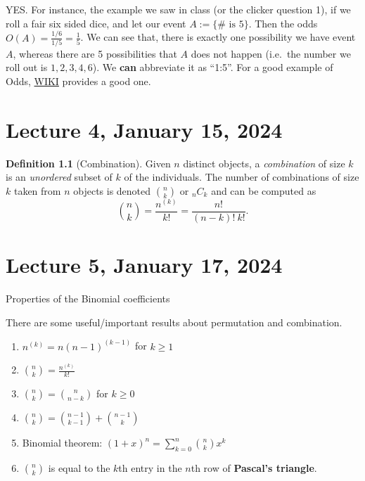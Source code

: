 \documentclass[
]{book}
\providecommand{\tightlist}{%
  \setlength{\itemsep}{0pt}\setlength{\parskip}{0pt}}
\theoremstyle{definition}
\newtheorem{definition}{Definition}[chapter]
\theoremstyle{definition}
\theoremstyle{definition}
\theoremstyle{definition}
\theoremstyle{remark}
\begin{document}
YES. For instance, the example we saw in class (or the clicker question 1), if we roll a fair six sided dice, and let our event \(A:=\{\text{# is } 5 \}\). Then the odds \(O(A)=\frac{1/6}{1/5}=\frac{1}{5}\). We can see that, there is exactly one possibility we have event \(A\), whereas there are 5 possibilities that \(A\) does not happen (i.e.~the number we roll out is \(1,2,3,4,6\)). We \textbf{can} abbreviate it as ``1:5''. For a good example of Odds, \href{https://en.wikipedia.org/wiki/Odds}{WIKI} provides a good one.

\hypertarget{lecture-4-january-15-2024}{%
\chapter{Lecture 4, January 15, 2024}\label{lecture-4-january-15-2024}}

\begin{definition}[Combination]
Given \(n\) distinct objects, a \emph{combination} of size \(k\) is an \emph{unordered} subset of \(k\) of the individuals. The number of combinations of size \(k\) taken from \(n\) objects is denoted \({n \choose k}\) or \({}_n C_k\) and can be computed as
\[
{n \choose k}=\frac{n^{(k)}}{k!}=\frac{n!}{(n-k)!\ k!}.
\]
\end{definition}

\hypertarget{lecture-5-january-17-2024}{%
\chapter{Lecture 5, January 17, 2024}\label{lecture-5-january-17-2024}}

Properties of the Binomial coefficients

There are some useful/important results about permutation and combination.

\begin{enumerate}
\def\labelenumi{\arabic{enumi}.}
\tightlist
\item
  \(n^{(k)} = n (n - 1)^{(k-1)}\) for \(k \geq 1\)
\item
  \({n \choose k} = \frac{n^{(k)}}{k!}\)
\item
  \({n \choose k} = {n \choose n-k}\) for \(k \geq 0\)
\item
  \({n \choose k} = {n-1 \choose k-1} + {n-1 \choose k}\)
\item
  Binomial theorem: \((1 + x)^n = \sum_{k=0}^n {n \choose k} x^k\)
\item
  \({n \choose k}\) is equal to the \(k\)th entry in the \(n\)th row of \textbf{Pascal's triangle}.
\end{enumerate}
\end{document}
